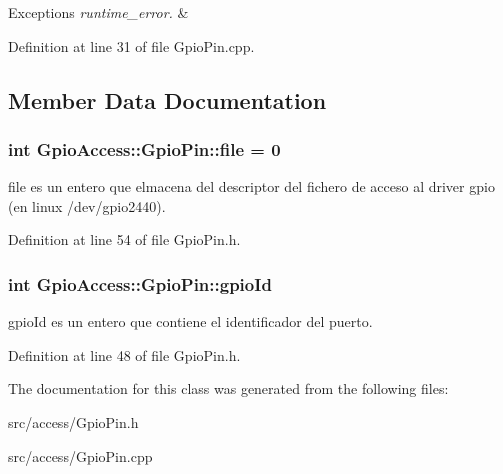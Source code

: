 \begin{DoxyExceptions}{\-Exceptions}
{\em runtime\-\_\-error.} & \\
\hline
\end{DoxyExceptions}


\-Definition at line 31 of file \-Gpio\-Pin.\-cpp.



\subsection{\-Member \-Data \-Documentation}
\hypertarget{class_gpio_access_1_1_gpio_pin_aa3cfd18199fbe18a6d7d74a7a753dbab}{
\subsubsection[{file}]{\setlength{\rightskip}{0pt plus 5cm}int {\bf \-Gpio\-Access\-::\-Gpio\-Pin\-::file} = 0}}\label{class_gpio_access_1_1_gpio_pin_aa3cfd18199fbe18a6d7d74a7a753dbab}
file es un entero que elmacena del descriptor del fichero de acceso al driver gpio (en linux /dev/gpio2440). 

\-Definition at line 54 of file \-Gpio\-Pin.\-h.

\hypertarget{class_gpio_access_1_1_gpio_pin_a662d9f6e22d338e0b182b3220a42f25d}{
\subsubsection[{gpio\-Id}]{\setlength{\rightskip}{0pt plus 5cm}int {\bf \-Gpio\-Access\-::\-Gpio\-Pin\-::gpio\-Id}}}\label{class_gpio_access_1_1_gpio_pin_a662d9f6e22d338e0b182b3220a42f25d}
gpio\-Id es un entero que contiene el identificador del puerto. 

\-Definition at line 48 of file \-Gpio\-Pin.\-h.



\-The documentation for this class was generated from the following files\-:\begin{DoxyCompactItemize}
\item 
src/access/\-Gpio\-Pin.\-h\item 
src/access/\-Gpio\-Pin.\-cpp\end{DoxyCompactItemize}
